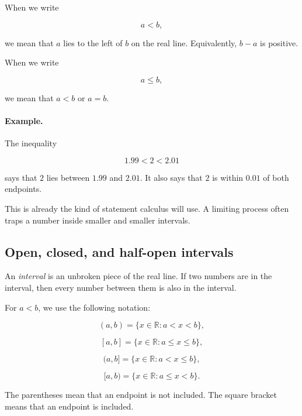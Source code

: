 When we write

\[
a<b,
\]

we mean that \(a\) lies to the left of \(b\) on the real line. Equivalently, \(b-a\) is positive.

When we write

\[
a\le b,
\]

we mean that \(a<b\) or \(a=b\).

\paragraph{Example.}
The inequality

\[
1.99<2<2.01
\]

says that \(2\) lies between \(1.99\) and \(2.01\). It also says that \(2\) is within \(0.01\) of both endpoints.

This is already the kind of statement calculus will use. A limiting process often traps a number inside smaller and smaller intervals.

\subsection{Open, closed, and half-open intervals}
\label{subsec:intervals}

An \emph{interval} is an unbroken piece of the real line. If two numbers are in the interval, then every number between them is also in the interval.

For \(a<b\), we use the following notation:

\[
(a,b)=\{x\in\mathbb R: a<x<b\},
\]

\[
[a,b]=\{x\in\mathbb R: a\le x\le b\},
\]

\[
(a,b]=\{x\in\mathbb R: a<x\le b\},
\]

\[
[a,b)=\{x\in\mathbb R: a\le x<b\}.
\]

The parentheses mean that an endpoint is not included. The square bracket means that an endpoint is included.

